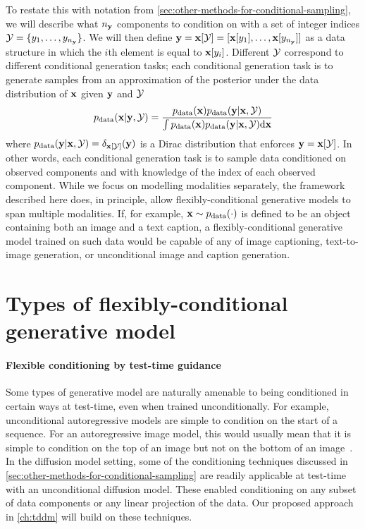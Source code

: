 To restate this with notation from \cref{sec:other-methods-for-conditional-sampling}, we will describe what $n_{\mathbf{y}}$ components to condition on with a set of integer indices ${\mathcal{Y}} = \{ y_1, \ldots, y_{n_{\mathbf{y}}} \}$. We will then define ${\mathbf{y}} = {\mathbf{x}}[{\mathcal{Y}}] = [ {\mathbf{x}}[y_1], \ldots, {\mathbf{x}}[y_{n_{\mathbf{y}}}] ]$ as a data structure in which the $i$th element is equal to ${\mathbf{x}}[y_i]$. Different ${\mathcal{Y}}$ correspond to different conditional generation tasks; each conditional generation task is to generate samples from an approximation of the posterior under the data distribution of ${\mathbf{x}}$ given ${\mathbf{y}}$ and ${\mathcal{Y}}$
\begin{equation} \label{eq:flexible-diffusion-target}
    p_{\rm{data}}({\mathbf{x}} | {\mathbf{y}}, {\mathcal{Y}}) = \frac{p_{\rm{data}}({\mathbf{x}})p_{\rm{data}}({\mathbf{y}}|{\mathbf{x}},{\mathcal{Y}})}{\int p_{\rm{data}}({\mathbf{x}})p_{\rm{data}}({\mathbf{y}}|{\mathbf{x}},{\mathcal{Y}}) \mathrm{d}{\mathbf{x}}} 
\end{equation}
where $p_{\rm{data}}({\mathbf{y}}|{\mathbf{x}},{\mathcal{Y}}) = \delta_{{\mathbf{x}}[{\mathcal{Y}}]}({\mathbf{y}})$ is a Dirac distribution that enforces ${\mathbf{y}} = {\mathbf{x}}[{\mathcal{Y}}]$.
In other words, each conditional generation task is to sample data conditioned on observed components and with knowledge of the index of each observed component. 
%
While we focus on modelling modalities separately, the framework described here does, in principle, allow flexibly-conditional generative models to span multiple modalities. If, for example, ${\mathbf{x}} \sim p_{\rm{data}}(\cdot)$ is defined to be an object containing both an image and a text caption, a flexibly-conditional generative model trained on such data would be capable of any of image captioning, text-to-image generation, or unconditional image and caption generation.


\section{Types of flexibly-conditional generative model}
\paragraph{Flexible conditioning by test-time guidance}
Some types of generative model are naturally amenable to being conditioned in certain ways at test-time, even when trained unconditionally. For example, unconditional autoregressive models are simple to condition on the start of a sequence. For an autoregressive image model, this would usually mean that it is simple to condition on the top of an image but not on the bottom of an image~\citep{van2016pixel}. In the diffusion model setting, some of the conditioning techniques discussed in \cref{sec:other-methods-for-conditional-sampling} are readily applicable at test-time with an unconditional diffusion model. These enabled conditioning on any subset of data components or any linear projection of the data. Our proposed approach in \cref{ch:tddm} will build on these techniques.

